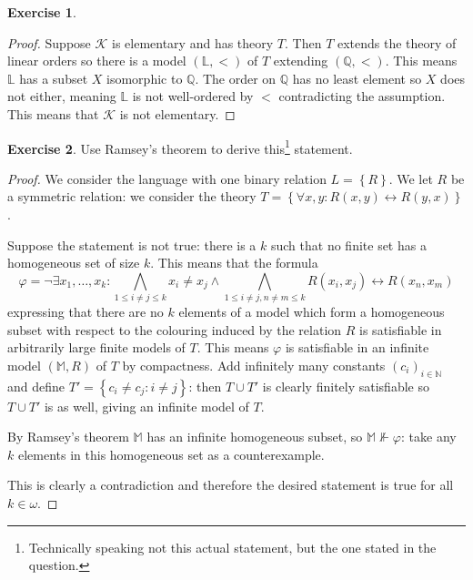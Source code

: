 \documentclass{article}
\newcommand{\N}{\mathbb{N}}
\newcommand{\Q}{\mathbb{Q}}
\newcommand{\set}[1]{\left\{#1\right\}}
\newcommand{\setwith}[2]{\left\{#1:#2\right\}}
\theoremstyle{definition}
\newtheorem{question}{Exercise}
\begin{document}
\begin{question}
\begin{enumerate}[(a)]
              \begin{proof}
                  Suppose \(\mathcal{K}\) is elementary and has theory \(T\).
                  Then \(T\) extends the theory of linear orders so there is a
                  model \((\mathbb{L},<)\) of \(T\) extending \((\Q,<)\). This
                  means \(\mathbb{L}\) has a subset \(X\) isomorphic to \(\Q\).
                  The order on \(\Q\) has no least element so \(X\) does not
                  either, meaning \(\mathbb{L}\) is not well-ordered by \(<\)
                  contradicting the assumption. This means that \(\mathcal{K}\)
                  is not elementary.
              \end{proof}
    \end{enumerate}
\end{question}

\begin{question}
    Use Ramsey's theorem to derive this\footnote{Technically speaking not this
        actual statement, but the one stated in the question.} statement.

    \begin{proof}
        We consider the language with one binary relation \(L=\set{R}\). We let
        \(R\) be a symmetric relation: we consider the theory \(T=\set{\forall
            x,y:R(x,y)\leftrightarrow R(y,x)}\).

        Suppose the statement is not true: there is a \(k\) such that no finite
        set has a homogeneous set of size \(k\). This means that the formula
        \[
            \varphi=\neg\exists x_{1},\ldots,x_{k}:\bigwedge_{1\leq i\neq j\leq k}x_{i}\neq x_{j}
            \wedge\bigwedge_{1\leq i\neq j,n\neq m\leq k}R(x_{i},x_{j})\leftrightarrow R(x_{n},x_{m})
        \]
        expressing that there are no \(k\) elements of a model which form a
        homogeneous subset with respect to the colouring induced by the relation
        \(R\) is satisfiable in arbitrarily large finite models of \(T\). This
        means \(\varphi\) is satisfiable in an infinite model \((\mathbb{M},R)\)
        of \(T\) by compactness. Add infinitely many constants
        \((c_{i})_{i\in\N}\) and define \(T'=\setwith{c_{i}\neq c_{j}}{i\neq
            j}\): then \(T\cup T'\) is clearly finitely satisfiable so \(T\cup T'\)
        is as well, giving an infinite model of \(T\).

        By Ramsey's theorem \(\mathbb{M}\) has an infinite homogeneous subset,
        so \(\mathbb{M}\nVdash\varphi\): take any \(k\) elements in this
        homogeneous set as a counterexample.

        This is clearly a contradiction and therefore the desired statement is
        true for all \(k\in\omega\).
    \end{proof}
\end{question}
\end{document}

